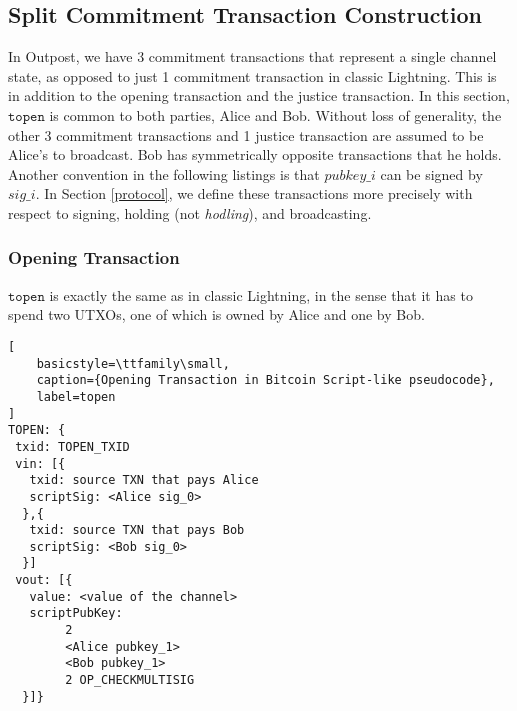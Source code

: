 \subsection{Split Commitment Transaction Construction}
In Outpost, we have 3 commitment transactions that represent a single channel state, as opposed to just 1 commitment transaction in classic Lightning. This is in addition to the opening transaction and the justice transaction. In this section, $\texttt{topen}$ is common to both parties, Alice and Bob. Without loss of generality, the other 3 commitment transactions and 1 justice transaction are assumed to be Alice's to broadcast. Bob has symmetrically opposite transactions that he holds. Another convention in the following listings is that $pubkey\_i$ can be signed by $sig\_i$. In Section \ref{protocol}, we define these transactions more precisely with respect to signing, holding (not \textit{hodling}), and broadcasting.
\subsubsection{Opening Transaction}
$\texttt{topen}$ is exactly the same as in classic Lightning, in the sense that it has to spend two UTXOs, one of which is owned by Alice and one by Bob. 

\begin{lstlisting}[
    basicstyle=\ttfamily\small,
    caption={Opening Transaction in Bitcoin Script-like pseudocode},
    label=topen
]
TOPEN: {
 txid: TOPEN_TXID
 vin: [{
   txid: source TXN that pays Alice
   scriptSig: <Alice sig_0>
  },{     
   txid: source TXN that pays Bob
   scriptSig: <Bob sig_0>
  }]      
 vout: [{
   value: <value of the channel>
   scriptPubKey: 
        2 
        <Alice pubkey_1> 
        <Bob pubkey_1> 
        2 OP_CHECKMULTISIG
  }]}
\end{lstlisting}

